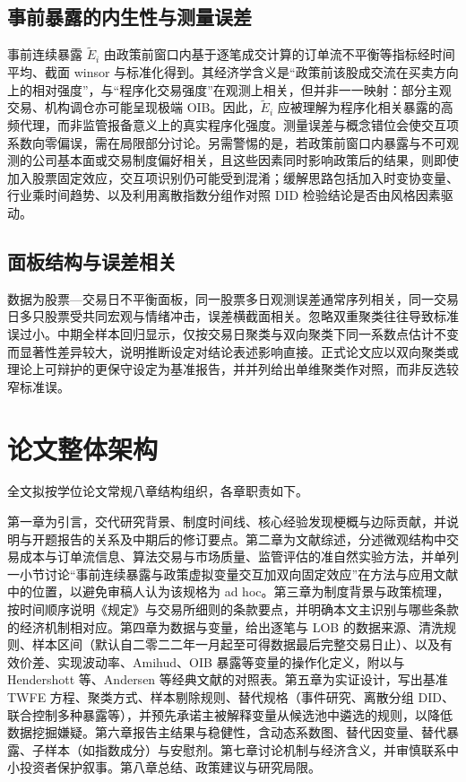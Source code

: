 \documentclass[UTF8, a4paper, 12pt]{ctexart}
\begin{document}
\subsection{事前暴露的内生性与测量误差}

事前连续暴露 \(\tilde{E}_i\) 由政策前窗口内基于逐笔成交计算的订单流不平衡等指标经时间平均、截面 winsor 与标准化得到。其经济学含义是“政策前该股成交流在买卖方向上的相对强度”，与“程序化交易强度”在观测上相关，但并非一一映射：部分主观交易、机构调仓亦可能呈现极端 OIB。因此，\(\tilde{E}_i\) 应被理解为程序化相关暴露的高频代理，而非监管报备意义上的真实程序化强度。测量误差与概念错位会使交互项系数向零偏误，需在局限部分讨论。另需警惕的是，若政策前窗口内暴露与不可观测的公司基本面或交易制度偏好相关，且这些因素同时影响政策后的结果，则即使加入股票固定效应，交互项识别仍可能受到混淆；缓解思路包括加入时变协变量、行业乘时间趋势、以及利用离散指数分组作对照 DID 检验结论是否由风格因素驱动。

\subsection{面板结构与误差相关}

数据为股票—交易日不平衡面板，同一股票多日观测误差通常序列相关，同一交易日多只股票受共同宏观与情绪冲击，误差横截面相关。忽略双重聚类往往导致标准误过小。中期全样本回归显示，仅按交易日聚类与双向聚类下同一系数点估计不变而显著性差异较大，说明推断设定对结论表述影响直接。正式论文应以双向聚类或理论上可辩护的更保守设定为基准报告，并并列给出单维聚类作对照，而非反选较窄标准误。

\section{论文整体架构}

全文拟按学位论文常规八章结构组织，各章职责如下。

第一章为引言，交代研究背景、制度时间线、核心经验发现梗概与边际贡献，并说明与开题报告的关系及中期后的修订要点。第二章为文献综述，分述微观结构中交易成本与订单流信息、算法交易与市场质量、监管评估的准自然实验方法，并单列一小节讨论“事前连续暴露与政策虚拟变量交互加双向固定效应”在方法与应用文献中的位置，以避免审稿人认为该规格为 ad hoc。第三章为制度背景与政策梳理，按时间顺序说明《规定》与交易所细则的条款要点，并明确本文主识别与哪些条款的经济机制相对应。第四章为数据与变量，给出逐笔与 LOB 的数据来源、清洗规则、样本区间（默认自二零二二年一月起至可得数据最后完整交易日止）、以及有效价差、实现波动率、Amihud、OIB 暴露等变量的操作化定义，附以与 Hendershott 等、Andersen 等经典文献的对照表。第五章为实证设计，写出基准 TWFE 方程、聚类方式、样本剔除规则、替代规格（事件研究、离散分组 DID、联合控制多种暴露等），并预先承诺主被解释变量从候选池中遴选的规则，以降低数据挖掘嫌疑。第六章报告主结果与稳健性，含动态系数图、替代因变量、替代暴露、子样本（如指数成分）与安慰剂。第七章讨论机制与经济含义，并审慎联系中小投资者保护叙事。第八章总结、政策建议与研究局限。
\end{document}
